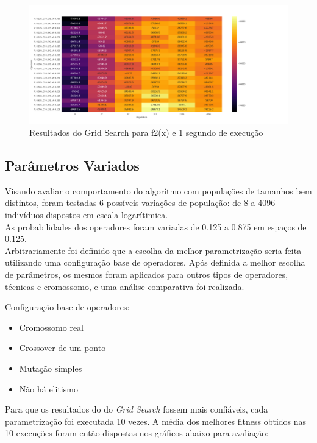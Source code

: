 \documentclass[conference]{IEEEtran}
\begin{document}
\begin{figure}[!t]
\centering
\includegraphics[scale=0.5]{f2_test_grid_search_1_second}
\caption{Resultados do Grid Search para f2(x) e 1 segundo de execução}
\end{figure}


\subsection{Parâmetros Variados}
Visando avaliar o comportamento do algorítmo com populações de tamanhos bem 
distintos, foram testadas 6 possíveis variações de população: de 8 a 4096
indivíduos dispostos em escala logarítimica.\\
As probabilidades dos operadores foram variadas de 0.125 a 0.875 em espaços de 
0.125.\\
Arbitrariamente foi definido que a escolha da melhor parametrização seria feita 
utilizando uma configuração base de operadores. Após definida a melhor escolha 
de parâmetros, os mesmos foram aplicados para outros tipos de operadores, técnicas e 
cromossomo, e uma análise comparativa foi realizada.

Configuração base de operadores:
\begin{itemize}
\item Cromossomo real
\item Crossover de um ponto
\item Mutação simples
\item Não há elitismo
\end{itemize}

Para que os resultados do do \textit{Grid Search} fossem mais confiáveis, cada
parametrização foi executada 10 vezes. A média dos melhores fitness obtidos nas
10 execuções foram então dispostas nos gráficos abaixo para avaliação:
\end{document}
